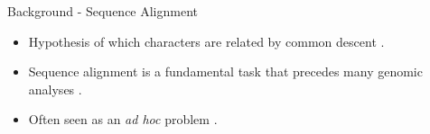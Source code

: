 \documentclass[aspectratio=169]{beamer}
\begin{document}
\begin{frame}{Background - Sequence Alignment} %
\begin{itemize}
	\setlength\itemsep{1em}
	\item Hypothesis of which characters are related by common descent \parencite{problems_cartwright_2009}.
	\item Sequence alignment is a fundamental task that precedes many genomic
			analyses \parencite{sequence_alignment_rosenberg_2009}.
	\item Often seen as an \textit{ad hoc} problem \cite{morrison_MSA_2018}.
\end{itemize}
\end{frame} %
\end{document}
